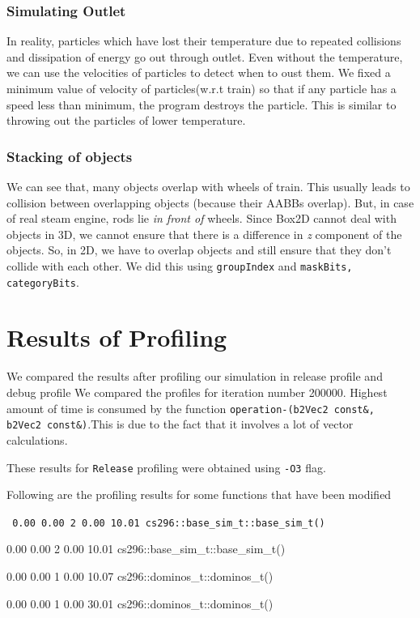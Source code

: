 \documentclass[11pt]{article}
\begin{document}
\subsubsection*{Simulating Outlet}
In reality, particles which have lost their temperature due to repeated collisions and dissipation of energy go out through outlet. Even without the temperature, we can use the velocities of particles to detect when to oust them. We fixed a minimum value of velocity of particles(w.r.t train) so that if any particle has a speed less than minimum, the program destroys the particle. This is similar to throwing out the particles of lower temperature.

\subsubsection*{Stacking of objects}
We can see that, many objects overlap with wheels of train. This usually leads to collision between overlapping objects (because their AABBs overlap). But, in case of real steam engine, rods lie {\it in front of} wheels. Since Box2D cannot deal with objects in 3D, we cannot ensure that there is a difference in {\it z} component of the objects. So, in 2D, we have to overlap objects and still ensure that they don't collide with each other. We did this using {\tt groupIndex} and {\tt maskBits, categoryBits}\cite{man}.

\section*{Results of Profiling}
We compared the results after profiling our simulation in release profile and debug profile
We compared the profiles for iteration number 200000. Highest amount of time is consumed by the function {\tt operation-(b2Vec2 const\&, b2Vec2 const\&)}.This is due to the fact that it involves a lot of vector calculations.

These results for {\tt Release} profiling were obtained using {\tt -O3} flag.


Following are the profiling results for some functions that have been modified



{\tt 
0.00   0.00        2     0.00    10.01  cs296::base\_sim\_t::base\_sim\_t()

0.00   0.00        2     0.00    10.01  cs296::base\_sim\_t::base\_sim\_t()

\vskip 0.2in

0.00   0.00        1     0.00    10.07  cs296::dominos\_t::dominos\_t()

0.00   0.00        1     0.00    30.01  cs296::dominos\_t::dominos\_t()
}
{}
\end{document}
